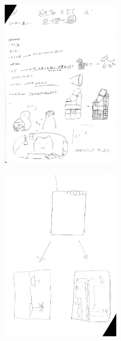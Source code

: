 \documentclass{funthesis}
\begin{document}
\begin{figure}[H]
 \begin{minipage}{0.47\hsize}
 \begin{center}
\includegraphics[width=50mm]{figures/group11.jpg}
 \end{center}
 \label{fig:seven}
 \end{minipage}
 \begin{minipage}{0.47\hsize}
 \begin{center}
 \includegraphics[width=50mm]{figures/group12.jpg}
 \end{center}
 \label{fig:eight}
 \end{minipage}
\end{figure}



\listoffigures

\listoftables
\end{document}
